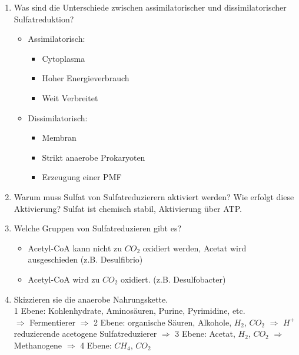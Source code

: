 \begin{enumerate}
	\item Was sind die Unterschiede zwischen assimilatorischer und dissimilatorischer Sulfatreduktion?
		\begin{itemize}
			\item Assimilatorisch: \begin{itemize}
							\item Cytoplasma 
							\item Hoher Energieverbrauch
							\item Weit Verbreitet
						\end{itemize}
			\item Dissimilatorisch: \begin{itemize}
							\item Membran
							\item Strikt anaerobe Prokaryoten
							\item Erzeugung einer PMF
						\end{itemize}
		\end{itemize}
	\item Warum muss Sulfat von Sulfatreduzierern aktiviert werden? Wie erfolgt diese Aktivierung?
		Sulfat ist chemisch stabil, Aktivierung \"uber ATP.
	\item Welche Gruppen von Sulfatreduzieren gibt es?
		\begin{itemize}
			\item Acetyl-CoA kann nicht zu $CO_2$ oxidiert werden, Acetat wird ausgeschieden (z.B. Desulfibrio)
			\item Acetyl-CoA wird zu $CO_2$ oxidiert. (z.B. Desulfobacter)
		\end{itemize}
	\item Skizzieren sie die anaerobe Nahrungskette.\\
	 1 Ebene: Kohlenhydrate, Aminos\"auren, Purine, Pyrimidine, etc. \\
	 $\Rightarrow$ Fermentierer $\Rightarrow$
	 2 Ebene: organische S\"auren, Alkohole, $H_2$, $CO_2$
	 $\Rightarrow$ $H^+$ reduzierende acetogene Sulfatreduzierer  $\Rightarrow$
	 3 Ebene: Acetat, $H_2$, $CO_2$
	 $\Rightarrow$ Methanogene $\Rightarrow$
	 4 Ebene: $CH_4$, $CO_2$


\end{enumerate}
